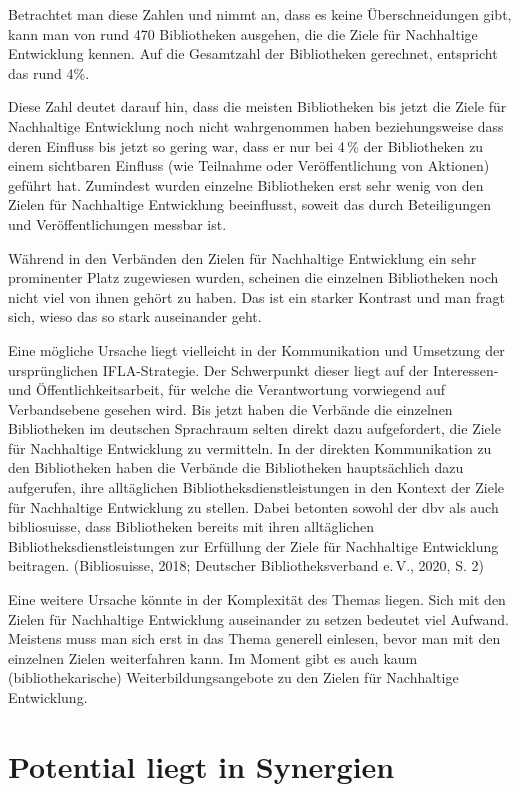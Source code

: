 \documentclass[a4paper,
fontsize=11pt,
oneside,
numbers=noperiodatend,
parskip=half-,
bibliography=totoc,
final
]{scrartcl}
\begin{document}
Betrachtet man diese Zahlen und nimmt an, dass es keine Überschneidungen
gibt, kann man von rund 470 Bibliotheken ausgehen, die die Ziele für
Nachhaltige Entwicklung kennen. Auf die Gesamtzahl der Bibliotheken
gerechnet, entspricht das rund 4\%.

Diese Zahl deutet darauf hin, dass die meisten Bibliotheken bis jetzt
die Ziele für Nachhaltige Entwicklung noch nicht wahrgenommen haben
beziehungsweise dass deren Einfluss bis jetzt so gering war, dass er nur
bei 4\,\% der Bibliotheken zu einem sichtbaren Einfluss (wie Teilnahme
oder Veröffentlichung von Aktionen) geführt hat. Zumindest wurden
einzelne Bibliotheken erst sehr wenig von den Zielen für Nachhaltige
Entwicklung beeinflusst, soweit das durch Beteiligungen und
Veröffentlichungen messbar ist.

Während in den Verbänden den Zielen für Nachhaltige Entwicklung ein sehr
prominenter Platz zugewiesen wurden, scheinen die einzelnen Bibliotheken
noch nicht viel von ihnen gehört zu haben. Das ist ein starker Kontrast
und man fragt sich, wieso das so stark auseinander geht.

Eine mögliche Ursache liegt vielleicht in der Kommunikation und
Umsetzung der ursprünglichen IFLA-Strategie. Der Schwerpunkt dieser
liegt auf der Interessen- und Öffentlichkeitsarbeit, für welche die
Verantwortung vorwiegend auf Verbandsebene gesehen wird. Bis jetzt haben
die Verbände die einzelnen Bibliotheken im deutschen Sprachraum selten
direkt dazu aufgefordert, die Ziele für Nachhaltige Entwicklung zu
vermitteln. In der direkten Kommunikation zu den Bibliotheken haben die
Verbände die Bibliotheken hauptsächlich dazu aufgerufen, ihre
alltäglichen Bibliotheksdienstleistungen in den Kontext der Ziele für
Nachhaltige Entwicklung zu stellen. Dabei betonten sowohl der dbv als
auch bibliosuisse, dass Bibliotheken bereits mit ihren alltäglichen
Bibliotheksdienstleistungen zur Erfüllung der Ziele für Nachhaltige
Entwicklung beitragen. (Bibliosuisse, 2018; Deutscher Bibliotheksverband
e.\,V., 2020, S. 2)

Eine weitere Ursache könnte in der Komplexität des Themas liegen. Sich
mit den Zielen für Nachhaltige Entwicklung auseinander zu setzen
bedeutet viel Aufwand. Meistens muss man sich erst in das Thema generell
einlesen, bevor man mit den einzelnen Zielen weiterfahren kann. Im
Moment gibt es auch kaum (bibliothekarische) Weiterbildungsangebote zu
den Zielen für Nachhaltige Entwicklung.

\hypertarget{potential-liegt-in-synergien}{%
\section{Potential liegt in
Synergien}\label{potential-liegt-in-synergien}}
\end{document}
